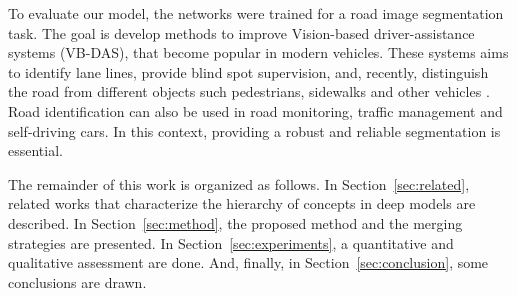 To evaluate our model, the networks were trained for a road image segmentation task. The goal is develop methods to improve Vision-based driver-assistance systems (VB-DAS), that become popular in modern vehicles. These systems aims to identify lane lines, provide blind spot supervision, and, recently, distinguish the road from different objects such pedestrians, sidewalks and other vehicles \cite{Saleem20018, Yang2018, Rezaei2017}. Road identification can also be used in road monitoring, traffic management and self-driving cars. In this context, providing a robust and reliable segmentation is essential.

 

The remainder of this work is organized as follows. In Section~\ref{sec:related}, related works that characterize the hierarchy of concepts in deep models are described. In Section~\ref{sec:method}, the proposed method and the merging strategies are presented. In Section~\ref{sec:experiments}, a quantitative and qualitative assessment are done. And, finally, in Section~\ref{sec:conclusion}, some conclusions are drawn.